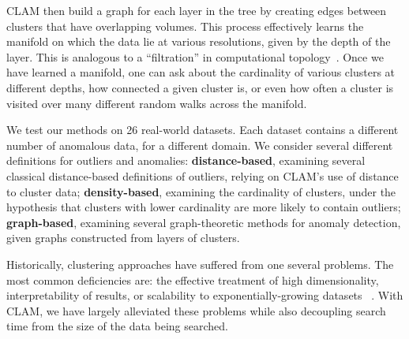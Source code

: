 CLAM then build a graph for each layer in the tree by creating edges between clusters that have overlapping volumes.
This process effectively learns the manifold on which the data lie at various resolutions, given by the depth of the layer. This is analogous to a ``filtration'' in computational topology~\cite{carlsson2009topology}.
Once we have learned a manifold, one can ask about the cardinality of various clusters at different depths, how connected a given cluster is, or even how often a cluster is visited over many different random walks across the manifold.

We test our methods on 26 real-world datasets. 
Each dataset contains a different number of anomalous data, for a different domain.
We consider several different definitions for outliers and anomalies: \textbf{distance-based}, examining several classical distance-based definitions of outliers, relying on CLAM's use of distance to cluster data; \textbf{density-based}, examining the cardinality of clusters, under the hypothesis that clusters with lower cardinality are more likely to contain outliers; \textbf{graph-based}, examining several graph-theoretic methods for anomaly detection, given graphs constructed from layers of clusters.

Historically, clustering approaches have suffered from one several problems.
The most common deficiencies are: the effective treatment of high dimensionality, interpretability of results, or scalability to exponentially-growing datasets ~\cite{rakesh_agrawal_automatic_1998}.
With CLAM, we have largely alleviated these problems while also decoupling search time from the size of the data being searched.
